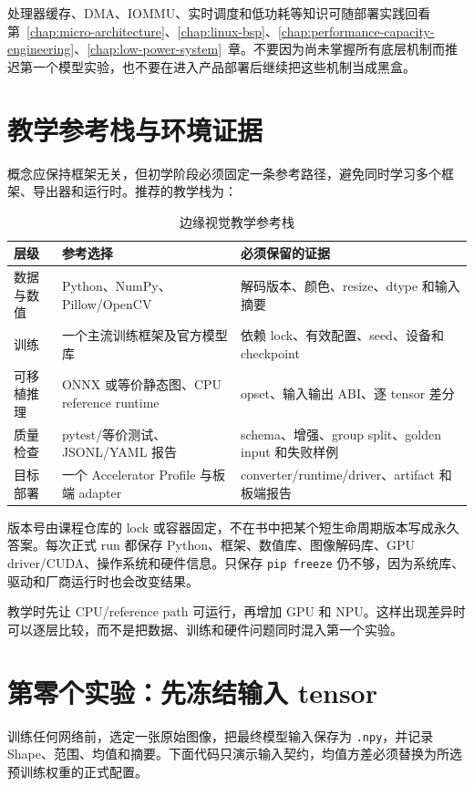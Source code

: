处理器缓存、DMA、IOMMU、实时调度和低功耗等知识可随部署实践回看第~\ref{chap:micro-architecture}、\ref{chap:linux-bsp}、\ref{chap:performance-capacity-engineering}、\ref{chap:low-power-system}~章。不要因为尚未掌握所有底层机制而推迟第一个模型实验，也不要在进入产品部署后继续把这些机制当成黑盒。

\section{教学参考栈与环境证据}

概念应保持框架无关，但初学阶段必须固定一条参考路径，避免同时学习多个框架、导出器和运行时。推荐的教学栈为：

\begin{table}[H]
  \centering
  \caption{边缘视觉教学参考栈}
  \begin{tabular}{p{27mm}p{43mm}p{62mm}}
    \hline
    层级 & 参考选择 & 必须保留的证据 \\
    \hline
    数据与数值 & Python、NumPy、Pillow/OpenCV & 解码版本、颜色、resize、dtype 和输入摘要 \\
    训练 & 一个主流训练框架及官方模型库 & 依赖 lock、有效配置、seed、设备和 checkpoint \\
    可移植推理 & ONNX 或等价静态图、CPU reference runtime & opset、输入输出 ABI、逐 tensor 差分 \\
    质量检查 & pytest/等价测试、JSONL/YAML 报告 & schema、增强、group split、golden input 和失败样例 \\
    目标部署 & 一个 Accelerator Profile 与板端 adapter & converter/runtime/driver、artifact 和板端报告 \\
    \hline
  \end{tabular}
\end{table}

版本号由课程仓库的 lock 或容器固定，不在书中把某个短生命周期版本写成永久答案。每次正式 run 都保存 Python、框架、数值库、图像解码库、GPU driver/CUDA、操作系统和硬件信息。只保存 \texttt{pip freeze} 仍不够，因为系统库、驱动和厂商运行时也会改变结果。

教学时先让 CPU/reference path 可运行，再增加 GPU 和 NPU。这样出现差异时可以逐层比较，而不是把数据、训练和硬件问题同时混入第一个实验。

\section{第零个实验：先冻结输入 tensor}

训练任何网络前，选定一张原始图像，把最终模型输入保存为 \texttt{.npy}，并记录 Shape、范围、均值和摘要。下面代码只演示输入契约，均值方差必须替换为所选预训练权重的正式配置。

